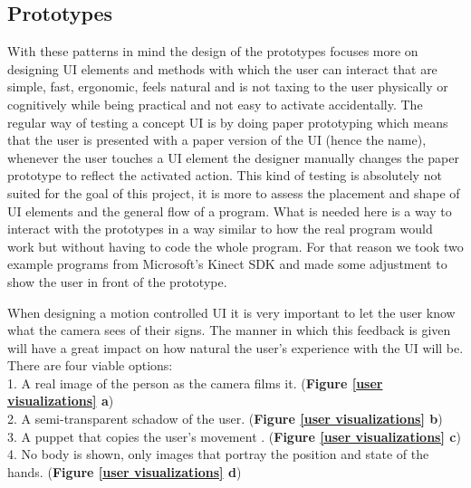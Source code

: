 \subsection{Prototypes}

With these patterns in mind the design of the prototypes focuses more on designing UI elements and methods with which the user can interact that are simple, fast, ergonomic, feels natural and is not taxing to the user physically or cognitively while being practical and not easy to activate accidentally. The regular way of testing a concept UI is by doing paper prototyping which means that the user is presented with a paper version of the UI (hence the name), whenever the user touches a UI element the designer manually changes the paper prototype to reflect the activated action. This kind of testing is absolutely not suited for the goal of this project, it is more to assess the placement and shape of UI elements and the general flow of a program. What is needed here is a way to interact with the prototypes in a way similar to how the real program would work but without having to code the whole program. For that reason we took two example programs from Microsoft's Kinect SDK and made some adjustment to show the user in front of the prototype. 

When designing a motion controlled UI it is very important to let the user know what the camera sees of their signs. The manner in which this feedback is given will have a great impact on how natural the user's experience with the UI will be. There are four viable options: \\
 1. A real image of the person as the camera films it.   (\textbf{Figure \ref{user visualizations} a}) \\
 2. A semi-transparent schadow of the user. (\textbf{Figure \ref{user visualizations} b}) \\
 3. A puppet that copies the user's movement .  (\textbf{Figure \ref{user visualizations} c}) \\
 4. No body is shown, only images that portray the position and state of the hands. (\textbf{Figure \ref{user visualizations} d}) \\ \\
 
